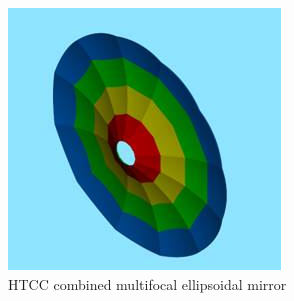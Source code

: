\begin{figure}[h]
    \centering
    \includegraphics[width=1.0\linewidth,trim={0 0cm 0 0},clip]{images/Colored_Mirror.jpg}
    \caption{HTCC combined multifocal ellipsoidal  mirror}
    \label{fig:Colored_Mirror}
\end{figure}


